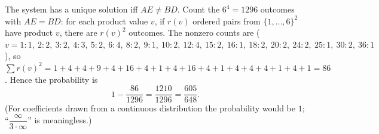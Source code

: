 The system has a unique solution iff $AE\ne BD$. Count the $6^4=1296$ outcomes with $AE=BD$: for each product value $v$, if $r(v)$ ordered pairs from $\{1,\dots,6\}^2$ have product $v$, there are $r(v)^2$ outcomes. The nonzero counts are ($v=1{:}1,\ 2{:}2,\ 3{:}2,\ 4{:}3,\ 5{:}2,\ 6{:}4,\ 8{:}2,\ 9{:}1,\ 10{:}2,\ 12{:}4,\ 15{:}2,\ 16{:}1,\ 18{:}2,\ 20{:}2,\ 24{:}2,\ 25{:}1,\ 30{:}2,\ 36{:}1$), so $\sum r(v)^2=1+4+4+9+4+16+4+1+4+16+4+1+4+4+4+1+4+1=86$. Hence the probability is
\[1-\dfrac{86}{1296}=\dfrac{1210}{1296}=\boxed{\dfrac{605}{648}}.\]
(For coefficients drawn from a continuous distribution the probability would be $1$; ``$\dfrac{\infty}{3\cdot\infty}$'' is meaningless.)
